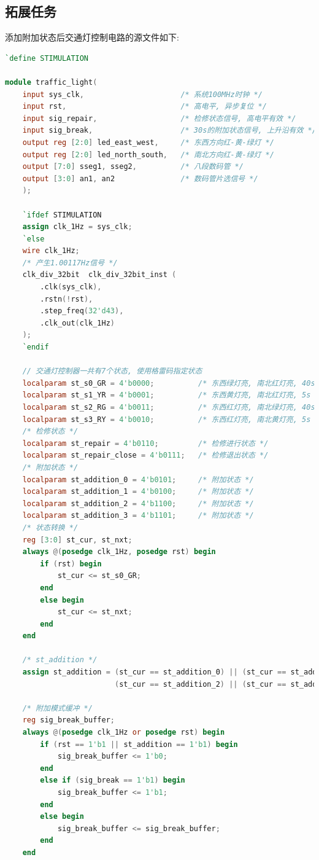 \documentclass{article}
\begin{document}
\subsection*{拓展任务}
添加附加状态后交通灯控制电路的源文件如下:
\begin{lstlisting}[language=Verilog, caption={添加附加状态的交通灯控制电路源文件}]
`define STIMULATION

module traffic_light(
    input sys_clk,                      /* 系统100MHz时钟 */
    input rst,                          /* 高电平, 异步复位 */
    input sig_repair,                   /* 检修状态信号, 高电平有效 */
    input sig_break,                    /* 30s的附加状态信号, 上升沿有效 */
    output reg [2:0] led_east_west,     /* 东西方向红-黄-绿灯 */
    output reg [2:0] led_north_south,   /* 南北方向红-黄-绿灯 */
    output [7:0] sseg1, sseg2,          /* 八段数码管 */
    output [3:0] an1, an2               /* 数码管片选信号 */
    );
    
    `ifdef STIMULATION
    assign clk_1Hz = sys_clk;
    `else
    wire clk_1Hz;
    /* 产生1.00117Hz信号 */
    clk_div_32bit  clk_div_32bit_inst (
        .clk(sys_clk),
        .rstn(!rst),
        .step_freq(32'd43),
        .clk_out(clk_1Hz)
    );
    `endif

    // 交通灯控制器一共有7个状态, 使用格雷码指定状态
    localparam st_s0_GR = 4'b0000;          /* 东西绿灯亮, 南北红灯亮, 40s */
    localparam st_s1_YR = 4'b0001;          /* 东西黄灯亮, 南北红灯亮, 5s */
    localparam st_s2_RG = 4'b0011;          /* 东西红灯亮, 南北绿灯亮, 40s */
    localparam st_s3_RY = 4'b0010;          /* 东西红灯亮, 南北黄灯亮, 5s */
    /* 检修状态 */
    localparam st_repair = 4'b0110;         /* 检修进行状态 */
    localparam st_repair_close = 4'b0111;   /* 检修退出状态 */
    /* 附加状态 */
    localparam st_addition_0 = 4'b0101;     /* 附加状态 */
    localparam st_addition_1 = 4'b0100;     /* 附加状态 */
    localparam st_addition_2 = 4'b1100;     /* 附加状态 */
    localparam st_addition_3 = 4'b1101;     /* 附加状态 */
    /* 状态转换 */
    reg [3:0] st_cur, st_nxt;
    always @(posedge clk_1Hz, posedge rst) begin
        if (rst) begin
            st_cur <= st_s0_GR;
        end
        else begin
            st_cur <= st_nxt;
        end
    end

    /* st_addition */
    assign st_addition = (st_cur == st_addition_0) || (st_cur == st_addition_1) ||
                         (st_cur == st_addition_2) || (st_cur == st_addition_3);

    /* 附加模式缓冲 */
    reg sig_break_buffer;
    always @(posedge clk_1Hz or posedge rst) begin
        if (rst == 1'b1 || st_addition == 1'b1) begin
            sig_break_buffer <= 1'b0;
        end
        else if (sig_break == 1'b1) begin
            sig_break_buffer <= 1'b1;
        end
        else begin
            sig_break_buffer <= sig_break_buffer;
        end
    end


\end{lstlisting}
\end{document}
